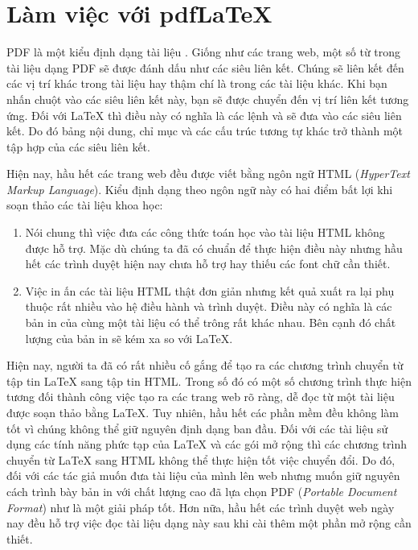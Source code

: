 \section{Làm việc với pdf\LaTeX} \label{sec:pdftex}
PDF là một kiểu định dạng tài liệu . Giống như các trang web, một số từ trong tài liệu dạng PDF sẽ được đánh dấu như các siêu liên kết. Chúng sẽ liên kết đến các vị trí khác trong tài liệu hay thậm chí là trong các tài liệu khác. Khi bạn nhấn chuột vào các siêu liên kết này, bạn sẽ được chuyển đến vị trí liên kết tương ứng. Đối với \LaTeX{} thì điều này có nghĩa là các lệnh  và  sẽ đưa vào các siêu liên kết. Do đó bảng nội dung, chỉ mục và các cấu trúc tương tự khác trở thành một tập hợp của các siêu liên kết.

Hiện nay, hầu hết các trang web đều được viết bằng ngôn ngữ HTML (\emph{HyperText Markup Language}). Kiểu định dạng theo ngôn ngữ này có hai điểm bất lợi khi soạn thảo các tài liệu khoa học:
\begin{enumerate}
\item Nói chung thì việc đưa các công thức toán học vào tài liệu HTML không được hỗ trợ. Mặc dù chúng ta đã có chuẩn để thực hiện điều này nhưng hầu hết các trình duyệt hiện nay chưa hỗ trợ hay thiếu các font chữ cần thiết. 
\item Việc in ấn các tài liệu HTML thật đơn giản nhưng kết quả xuất ra lại phụ thuộc rất nhiều vào hệ điều hành và trình duyệt. Điều này có nghĩa là các bản in của cùng một tài liệu có thể trông rất khác nhau. Bên cạnh đó chất lượng của bản in sẽ kém xa so với \LaTeX{}.
\end{enumerate}
Hiện nay, người ta đã có rất nhiều cố gắng để tạo ra các chương trình chuyển từ tập tin \LaTeX{} sang tập tin HTML. Trong số đó có một số chương trình thực hiện tương đối thành công việc tạo ra các trang web rõ ràng, dễ đọc từ một tài liệu được soạn thảo bằng \LaTeX{}. Tuy nhiên, hầu hết các phần mềm đều không làm tốt vì chúng không thể giữ nguyên định dạng ban đầu. Đối với các tài liệu sử dụng các tính năng phức tạp của \LaTeX{} và các gói mở rộng thì các chương trình chuyển từ \LaTeX{} sang HTML không thể thực hiện tốt việc chuyển đổi. Do đó, đối với các tác giả muốn đưa tài liệu của mình lên web nhưng muốn giữ nguyên cách trình bày bản in với chất lượng cao đã lựa chọn PDF (\emph{Portable Document Format})
như là một giải pháp tốt. Hơn nữa, hầu hết các trình duyệt web ngày nay đều hỗ trợ việc đọc tài liệu dạng này sau khi cài thêm một phần mở rộng cần thiết.

